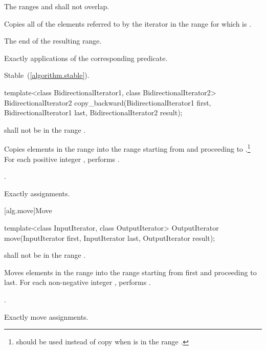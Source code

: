 \begin{itemdescr}
\pnum
\requires The ranges  and  shall not overlap.

\pnum
\effects Copies all of the elements referred to by the iterator  in the range 
for which  is .

\pnum
\returns The end of the resulting range.

\pnum
\complexity Exactly  applications of the corresponding predicate.

\pnum
\remarks Stable~(\ref{algorithm.stable}).
\end{itemdescr}


%
\begin{itemdecl}
template<class BidirectionalIterator1, class BidirectionalIterator2>
  BidirectionalIterator2
    copy_backward(BidirectionalIterator1 first,
                  BidirectionalIterator1 last,
                  BidirectionalIterator2 result);
\end{itemdecl}

\begin{itemdescr}
\pnum
\requires
{}
shall not be in the range
.

\pnum
\effects
Copies elements in the range 
into the
range 
starting from
and proceeding to .\footnote{
should be used instead of copy when 
is in
the range
.}
For each positive integer
,
performs
.

\pnum
\returns
{}.

\pnum
\complexity
Exactly
assignments.
\end{itemdescr}

[alg.move]{Move}

%
\begin{itemdecl}
template<class InputIterator, class OutputIterator>
  OutputIterator move(InputIterator first, InputIterator last,
                      OutputIterator result);
\end{itemdecl}


\begin{itemdescr}
\pnum
\requires
{}
shall not be in the range
.

\pnum
\effects
Moves elements in the range 
into the range 
starting from first and proceeding to last.
For each non-negative integer
,
performs
 .

\pnum
\returns
{}.

\pnum
\complexity
Exactly
move assignments.
\end{itemdescr}

